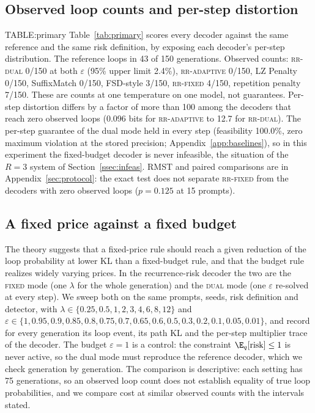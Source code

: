 \subsection{Observed loop counts and per-step distortion}\label{ssec:common-kl}
{{TABLE:primary}}
Table~\ref{tab:primary} scores every decoder against the same reference and the same risk definition, by exposing each decoder's per-step distribution. The reference loops in 43 of 150 generations. Observed counts: \textsc{rr-dual} 0/150 at both $\varepsilon$ (95\% upper limit 2.4\%), \textsc{rr-adaptive} 0/150, LZ Penalty 0/150, SuffixMatch 0/150, FSD-style 3/150, \textsc{rr-fixed} 4/150, repetition penalty 7/150. These are counts at one temperature on one model, not guarantees. Per-step distortion differs by a factor of more than 100 among the decoders that reach zero observed loops (0.096 bits for \textsc{rr-adaptive} to 12.7 for \textsc{rr-dual}). The per-step guarantee of the dual mode held in every step (feasibility 100.0\%, zero maximum violation at the stored precision; Appendix~\ref{app:baselines}), so in this experiment the fixed-budget decoder is never infeasible, the situation of the $R=3$ system of Section~\ref{ssec:infeas}. RMST and paired comparisons are in Appendix~\ref{sec:protocol}: the exact test does not separate \textsc{rr-fixed} from the decoders with zero observed loops ($p=0.125$ at 15 prompts).

\subsection{A fixed price against a fixed budget}\label{ssec:frontier}
The theory suggests that a fixed-price rule should reach a given reduction of the loop probability at lower KL than a fixed-budget rule, and that the budget rule realizes widely varying prices. In the recurrence-risk decoder the two are the \textsc{fixed} mode (one $\lambda$ for the whole generation) and the \textsc{dual} mode (one $\varepsilon$ re-solved at every step). We sweep both on the same prompts, seeds, risk definition and detector, with $\lambda\in\{0.25,0.5,1,2,3,4,6,8,12\}$ and $\varepsilon\in\{1,0.95,0.9,0.85,0.8,0.75,0.7,0.65,0.6,0.5,0.3,0.2,0.1,0.05,0.01\}$, and record for every generation its loop event, its path KL and the per-step multiplier trace of the decoder. The budget $\varepsilon=1$ is a control: the constraint $\E_q[\mathrm{risk}]\le1$ is never active, so the dual mode must reproduce the reference decoder, which we check generation by generation. The comparison is descriptive: each setting has 75 generations, so an observed loop count does not establish equality of true loop probabilities, and we compare cost at similar observed counts with the intervals stated.

